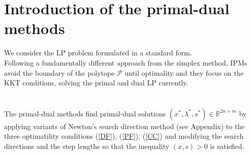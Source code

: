 \documentclass[a4paper,10 pt,titlepage,twoside]{book}
\theoremstyle{plain}
\theoremstyle{definition}
\theoremstyle{remark}
\begin{document}
\section{Introduction of the primal-dual methods}
We consider the LP problem formulated in a standard form. \\
Following a fundamentally different approach from the simplex method, IPMs avoid the boundary of the polytope $\mathcal{P}$ until optimality and they focus on the KKT conditions, solving the primal and dual LP currently.\\
\\
\\
The primal-dual methods find primal-dual solutions $(x^{*},\lambda^{*},s^{*})\in\mathbb{R}^{2n+m}$ by applying variants of Newton's search direction method (see Appendix) to the three optimatility conditions (\ref{DF}), (\ref{PF}), (\ref{CC}) and modifying the search directions and the step lengths so that the inequality $(x,s)>0$ is satisfied.\\
\end{document}
